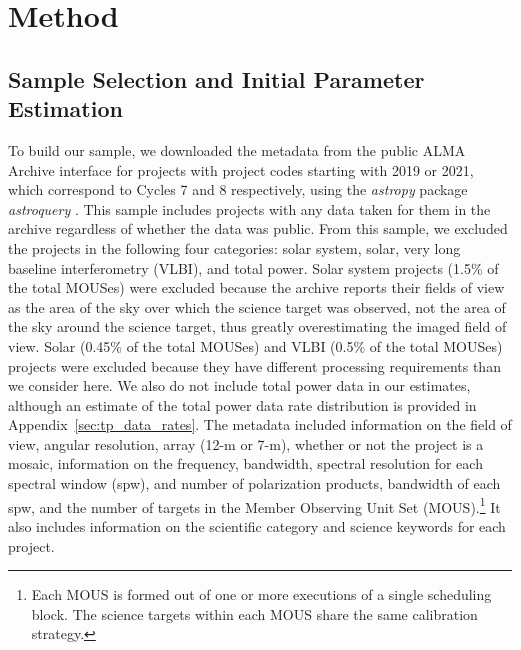 \documentclass[preprint]{aastex631}
\begin{document}
\section{Method} \label{sec:method}

\subsection{Sample Selection and Initial Parameter Estimation} \label{sec:method_sample}




To build our sample, we downloaded the metadata from the public ALMA Archive interface for projects with project codes starting with 2019 or 2021, which correspond to Cycles 7 and 8 respectively, using the {\it astropy} package {\it astroquery} \citep{Ginsburg2019AstroqueryPython}. This sample includes projects with any data taken for them in the archive regardless of whether the data was public. From this sample, we excluded the projects in the following four categories: solar system,  solar, very long baseline interferometry (VLBI), and total power. Solar system projects (1.5\% of the total MOUSes) were excluded because the archive reports their fields of view as the area of the sky over which the science target was observed, not the area of the sky around the science target, thus greatly overestimating the imaged field of view. Solar (0.45\% of the total MOUSes) and VLBI (0.5\% of the total MOUSes) projects were excluded because they have different processing requirements than we consider here.  We also do not include total power data in our estimates, although an estimate of the total power data rate distribution is provided in Appendix~\ref{sec:tp_data_rates}. The metadata included information on the field of view, angular resolution, array (12-m or 7-m), whether or not the project is a mosaic, information on the frequency, bandwidth, spectral resolution for each spectral window (spw), and number of polarization products, bandwidth of each spw, and the number of targets in the Member Observing Unit Set (MOUS).\footnote{Each MOUS is formed out of one or more executions of a single scheduling block. The science targets within each MOUS share the same calibration strategy.} It also includes information on the scientific category and science keywords for each project.
\end{document}
